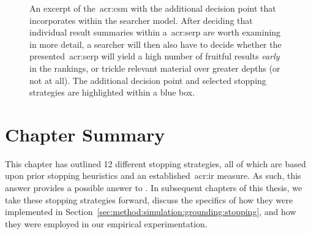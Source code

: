 \begin{figure}[t!]
    \centering
    \caption[Flowchart of the flow of stopping strategy ]{An excerpt of the~\gls{acr:csm} with the additional decision point that  incorporates within the searcher model. After deciding that individual result summaries within a~\gls{acr:serp} are worth examining in more detail, a searcher will then also have to decide whether the presented~\gls{acr:serp} will yield a high number of fruitful results \emph{early} in the rankings, or trickle relevant material over greater depths (or not at all). The additional decision point and selected stopping strategies are highlighted within a blue box.}
    \label{fig:ss11_combo}
\end{figure}

\section{Chapter Summary}
This chapter has outlined 12 different stopping strategies, all of which are based upon prior stopping heuristics and an established~\gls{acr:ir} measure. As such, this answer provides a possible answer to . In subsequent chapters of this thesis, we take these stopping strategies forward, discuss the specifics of how they were implemented in Section~\ref{sec:method:simulation:grounding:stopping}, and how they were employed in our empirical experimentation.